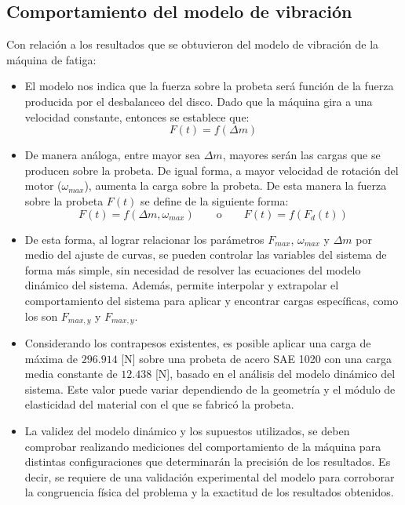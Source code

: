 \subsection{Comportamiento del modelo de vibración}
Con relación a los resultados que se obtuvieron del modelo de vibración de la máquina de fatiga:
\begin{itemize}
	\item El modelo nos indica que la fuerza sobre la probeta será función de la fuerza producida por el desbalanceo del disco. Dado que la máquina gira a una velocidad constante, entonces se establece que:
	\begin{equation*}
		F(t) = f(\Delta m)
	\end{equation*}
	\item De manera análoga, entre mayor sea $\Delta m$, mayores serán las cargas que se producen sobre la probeta. De igual forma, a mayor velocidad de rotación del motor ($\omega_{max}$), aumenta la carga sobre la probeta. De esta manera la fuerza sobre la probeta $F(t)$ se define de la siguiente forma:
	\begin{equation*}
		F(t) = f (\Delta m, \omega_{max}) \qquad \text{o} \qquad F(t) = f(F_d(t))
	\end{equation*}
	\item De esta forma, al lograr relacionar los parámetros $F_{max}$, $\omega_{max}$ y $\Delta m$ por medio del ajuste de curvas, se pueden controlar las variables del sistema de forma más simple, sin necesidad de resolver las ecuaciones del modelo dinámico del sistema. Además, permite interpolar y extrapolar el comportamiento del sistema para aplicar y encontrar cargas específicas, como los son $F_{max,y}$ y $F_{max,y}$.
	\item Considerando los contrapesos existentes, es posible aplicar una carga de máxima de $296.914$ [N] sobre una probeta de acero SAE 1020 con una carga media constante de $12.438$ [N], basado en el análisis del modelo dinámico del sistema. Este valor puede variar dependiendo de la geometría y el módulo de elasticidad del material con el que se fabricó la probeta.
	\item La validez del modelo dinámico y los supuestos utilizados, se deben comprobar realizando mediciones del comportamiento de la máquina para distintas configuraciones que determinarán la precisión de los resultados. Es decir, se requiere de una validación experimental del modelo para corroborar la congruencia física del problema y la exactitud de los resultados obtenidos.
\end{itemize}

